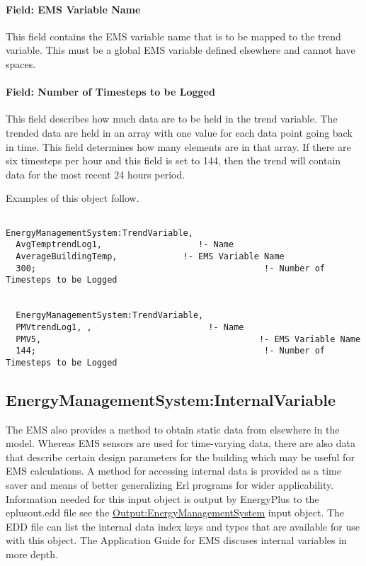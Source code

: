 \paragraph{Field: EMS Variable Name}\label{field-ems-variable-name-2}

This field contains the EMS variable name that is to be mapped to the trend variable. This must be a global EMS variable defined elsewhere and cannot have spaces.

\paragraph{Field: Number of Timesteps to be Logged}\label{field-number-of-timesteps-to-be-logged}

This field describes how much data are to be held in the trend variable. The trended data are held in an array with one value for each data point going back in time. This field determines how many elements are in that array. If there are six timesteps per hour and this field is set to 144, then the trend will contain data for the most recent 24 hours period.

Examples of this object follow.

\begin{lstlisting}

EnergyManagementSystem:TrendVariable,
  AvgTemptrendLog1,                   !- Name
  AverageBuildingTemp,             !- EMS Variable Name
  300;                                             !- Number of Timesteps to be Logged


  EnergyManagementSystem:TrendVariable,
  PMVtrendLog1, ,                       !- Name
  PMV5,                                           !- EMS Variable Name
  144;                                             !- Number of Timesteps to be Logged
\end{lstlisting}

\subsection{EnergyManagementSystem:InternalVariable}\label{energymanagementsysteminternalvariable}

The EMS also provides a method to obtain static data from elsewhere in the model. Whereas EMS sensors are used for time-varying data, there are also data that describe certain design parameters for the building which may be useful for EMS calculations. A method for accessing internal data is provided as a time saver and means of better generalizing Erl programs for wider applicability. Information needed for this input object is output by EnergyPlus to the eplusout.edd file see the \hyperref[outputenergymanagementsystem]{Output:EnergyManagementSystem} input object. The EDD file can list the internal data index keys and types that are available for use with this object. The Application Guide for EMS discuses internal variables in more depth.

